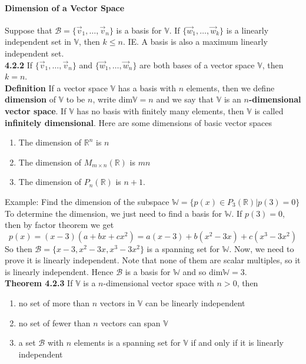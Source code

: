 \documentclass[10pt,letter]{article}
\begin{document}
\paragraph{Dimension of a Vector Space} Suppose that $\mathcal{B}=\{\vec{v}_1,\ldots,\vec{v}_n\}$ is a basis for $\mathbb{V}$. If $\{\vec{w}_1,\ldots,\vec{w}_k\}$ is a linearly independent set in $\mathbb{V}$, then $k\leq n$. IE. A basis is also a maximum linearly independent set. \\ 
\textbf{4.2.2} If $\{\vec{v}_1,\ldots,\vec{v}_n\}$ and $\{\vec{w}_1,\ldots,\vec{w}_n\}$ are both bases of a vector space $\mathbb{V}$, then $k=n$. \\ 
\textbf{Definition} If a vector space $\mathbb{V}$ has a basis with $n$ elements, then we define \textbf{dimension} of $\mathbb{V}$ to be $n$, write dim$\mathbb{V}=n$ and we say that $\mathbb{V}$ is an \textbf{$n$-dimensional vector space}. If $\mathbb{V}$ has no basis with finitely many elements, then $\mathbb{V}$ is called \textbf{infinitely dimensional}. Here are some dimensions of basic vector spaces \begin{enumerate}
    \item The dimension of $\mathbb{R}^n$ is $n$ 
    \item The dimension of $M_{m\times n}(\mathbb{R})$ is $mn$ 
    \item The dimension of $P_n(\mathbb{R})$ is $n+1$. 
\end{enumerate}
Example: Find the dimension of the subspace $\mathbb{W}=\{p(x)\in P_3(\mathbb{R})|p(3)=0\}$ \\ 
To determine the dimension, we just need to find a basis for $\mathbb{W}$. If $p(3)=0$, then by factor theorem we get $$p(x)=(x-3)(a+bx+cx^2)=a(x-3)+b(x^2-3x)+c(x^3-3x^2)$$ So then $\mathcal{B}=\{x-3,x^2-3x,x^3-3x^2\}$ is a spanning set for $\mathbb{W}$. Now, we need to prove it is linearly independent. Note that none of them are scalar multiples, so it is linearly independent. Hence $\mathcal{B}$ is a basis for $\mathbb{W}$ and so dim$\mathbb{W}=3$. \\ 
\textbf{Theorem 4.2.3} If $\mathbb{V}$ is a $n$-dimensional vector space with $n>0$, then \begin{enumerate}
    \item no set of more than $n$ vectors in $\mathbb{V}$ can be linearly independent 
    \item no set of fewer than $n$ vectors can span $\mathbb{V}$ 
    \item a set $\mathcal{B}$ with $n$ elements is a spanning set for $\mathbb{V}$ if and only if it is linearly independent
\end{enumerate}
\end{document}
